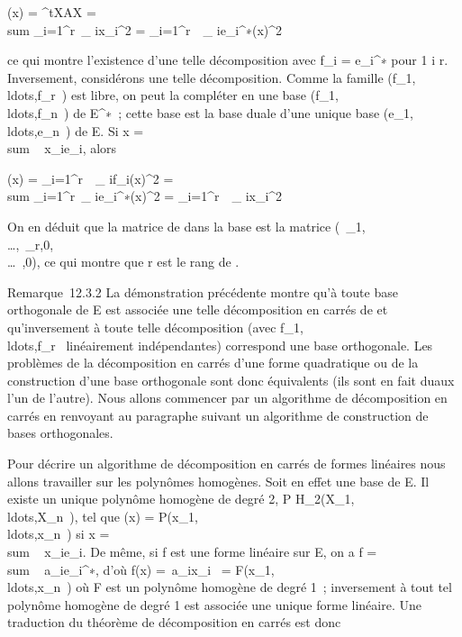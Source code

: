 \documentclass[]{article}
\begin{document}
\Phi(x) = ^tXAX = \\sum
\_i=1^r\alpha~\_ ix\_i^2 =
\sum \_i=1^r\alpha~~\_
ie\_i^∗(x)^2

ce qui montre l'existence d'une telle décomposition avec f\_i =
e\_i^∗ pour 1 \leq i \leq r. Inversement, considérons une telle
décomposition. Comme la famille
(f\_1,\\ldots,f\_r~)
est libre, on peut la compléter en une base
(f\_1,\\ldots,f\_n~)
de E^∗~; cette base est la base duale d'une unique base
(e\_1,\\ldots,e\_n~)
de E. Si x = \\sum ~
x\_ie\_i, alors

\Phi(x) = \sum \_i=1^r\alpha~~\_
if\_i(x)^2 = \\sum
\_i=1^r\alpha~\_ ie\_i^∗(x)^2
= \sum \_i=1^r\alpha~~\_
ix\_i^2

On en déduit que la matrice de \Phi dans la base  est la matrice
\mathrmdiag(\alpha~\_1,\\\ldots,\alpha~\_r,0,\\\ldots~,0),
ce qui montre que r est le rang de \Phi.

Remarque~12.3.2 La démonstration précédente montre qu'à toute base
orthogonale de E est associée une telle décomposition en carrés de \Phi et
qu'inversement à toute telle décomposition (avec
f\_1,\\ldots,f\_r~
linéairement indépendantes) correspond une base orthogonale. Les
problèmes de la décomposition en carrés d'une forme quadratique ou de la
construction d'une base orthogonale sont donc équivalents (ils sont en
fait duaux l'un de l'autre). Nous allons commencer par un algorithme de
décomposition en carrés en renvoyant au paragraphe suivant un algorithme
de construction de bases orthogonales.

Pour décrire un algorithme de décomposition en carrés de formes
linéaires nous allons travailler sur les polynômes homogènes. Soit en
effet  une base de E. Il existe un unique polynôme homogène de degré 2,
P \in
H\_2(X\_1,\\ldots,X\_n~),
tel que \Phi(x) =
P(x\_1,\\ldots,x\_n~)
si x = \\sum ~
x\_ie\_i. De même, si f est une forme linéaire sur E, on
a f = \\sum ~
a\_ie\_i^∗, d'où f(x) =\
\sum  a\_ix\_i~ =
F(x\_1,\\ldots,x\_n~)
où F est un polynôme homogène de degré 1~; inversement à tout tel
polynôme homogène de degré 1 est associée une unique forme linéaire. Une
traduction du théorème de décomposition en carrés est donc
\end{document}

